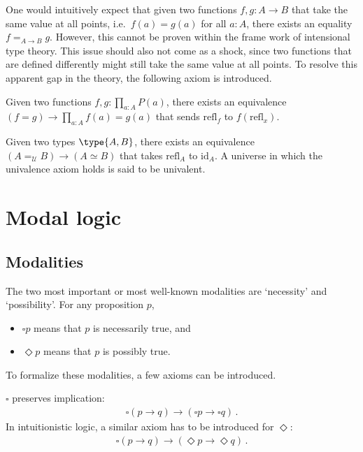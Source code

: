     One would intuitively expect that given two functions $f,g:A\rightarrow B$ that take the same value at all points, i.e.~$f(a)=g(a)$ for all $a:A$, there exists an equality $f=_{A\rightarrow B}g$. However, this cannot be proven within the frame work of intensional type theory. This issue should also not come as a shock, since two functions that are defined differently might still take the same value at all points. To resolve this apparent gap in the theory, the following axiom is introduced.
    \begin{axiom}
        Given two functions $f,g:\prod_{a:A}P(a)$, there exists an equivalence $(f=g)\rightarrow\prod_{a:A}f(a)=g(a)$ that sends $\mathrm{refl}_f$ to $f(\mathrm{refl}_x)$.
    \end{axiom}
    \begin{axiom}
        Given two types $\type{A,B}$, there exists an equivalence $(A=_{\mathcal{U}}B)\rightarrow(A\simeq B)$ that takes $\mathrm{refl}_A$ to $\mathrm{id}_A$. A universe in which the univalence axiom holds is said to be univalent.
    \end{axiom}

\section{Modal logic}\label{section:modal_logic}
\subsection{Modalities}

    The two most important or most well-known modalities are `necessity' and `possibility'. For any proposition $p$,
    \begin{itemize}
        \item $\square p$ means that $p$ is necessarily true, and
        \item $\Diamond p$ means that $p$ is possibly true.
    \end{itemize}
    To formalize these modalities, a few axioms can be introduced.

    \begin{axiom}[K]
        $\square$ preserves implication:
        \begin{gather}
            \square(p\rightarrow q)\rightarrow(\square p\rightarrow\square q)\,.
        \end{gather}
        In intuitionistic logic, a similar axiom has to be introduced for $\Diamond$:
        \begin{gather}
            \square(p\rightarrow q)\rightarrow(\Diamond p\rightarrow\Diamond q)\,.
        \end{gather}
    \end{axiom}

